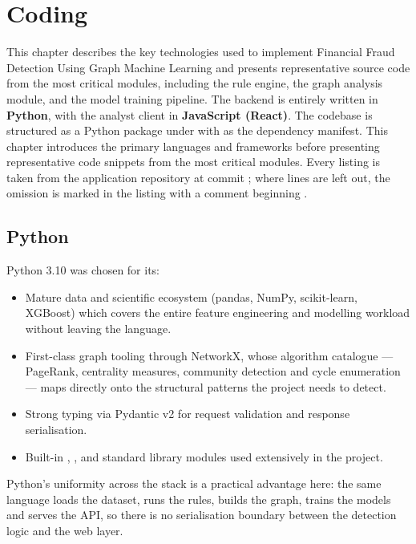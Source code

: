\chapter{Coding}

This chapter describes the key technologies used to implement Financial Fraud Detection Using Graph Machine Learning and presents representative source code from the most critical modules, including the rule engine, the graph analysis module, and the model training pipeline. The backend is entirely written in \textbf{Python}, with the analyst client in \textbf{JavaScript (React)}. The codebase is structured as a Python package under  with  as the dependency manifest. This chapter introduces the primary languages and frameworks before presenting representative code snippets from the most critical modules. Every listing is taken from the application repository at commit ; where lines are left out, the omission is marked in the listing with a comment beginning .

\section{Python}
Python 3.10 was chosen for its:

\begin{itemize}
  \item Mature data and scientific ecosystem (pandas, NumPy, scikit-learn, XGBoost) which covers the entire feature engineering and modelling workload without leaving the language.
  \item First-class graph tooling through NetworkX, whose algorithm catalogue --- PageRank, centrality measures, community detection and cycle enumeration --- maps directly onto the structural patterns the project needs to detect.
  \item Strong typing via Pydantic v2 for request validation and response serialisation.
  \item Built-in , ,  and  standard library modules used extensively in the project.
\end{itemize}

Python's uniformity across the stack is a practical advantage here: the same language loads the dataset, runs the rules, builds the graph, trains the models and serves the API, so there is no serialisation boundary between the detection logic and the web layer.


